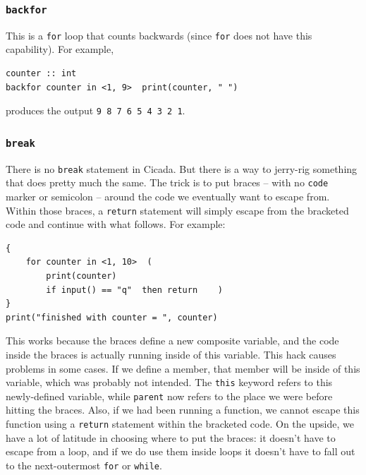 \documentclass{article}
\newenvironment{code}{
       \begin{list}{}{
               \setlength{\leftmargin}{.4in}
               \setlength{\rightmargin}{0in}
               \setlength{\topsep}{.2in}
       }
       \small
       \item[] }
       { \end{list}   }
\begin{document}


\subsubsection{\texttt{backfor}} 

This is a \verb$for$ loop that counts backwards (since \verb$for$ does not have this capability).  For example,

\begin{code} \begin{verbatim}
counter :: int
backfor counter in <1, 9>  print(counter, " ")
\end{verbatim} \end{code}

\noindent produces the output \verb$9 8 7 6 5 4 3 2 1$.





\subsubsection{\texttt{break}} 

There is no \verb#break# statement in Cicada.  But there is a way to jerry-rig something that does pretty much the same.  The trick is to put braces -- with no \verb#code# marker or semicolon -- around the code we eventually want to escape from.  Within those braces, a \verb#return# statement will simply escape from the bracketed code and continue with what follows.  For example:

\begin{code} \begin{verbatim}
{
    for counter in <1, 10>  (
        print(counter)
        if input() == "q"  then return    )
}
print("finished with counter = ", counter)
\end{verbatim} \end{code}

\noindent This works because the braces define a new composite variable, and the code inside the braces is actually running inside of this variable.  This hack causes problems in some cases.  If we define a member, that member will be inside of this variable, which was probably not intended.  The \verb#this# keyword refers to this newly-defined variable, while \verb#parent# now refers to the place we were before hitting the braces.  Also, if we had been running a function, we cannot escape this function using a \verb#return# statement within the bracketed code.  On the upside, we have a lot of latitude in choosing where to put the braces:  it doesn't have to escape from a loop, and if we do use them inside loops it doesn't have to fall out to the next-outermost \verb#for# or \verb#while#.
\end{document}
